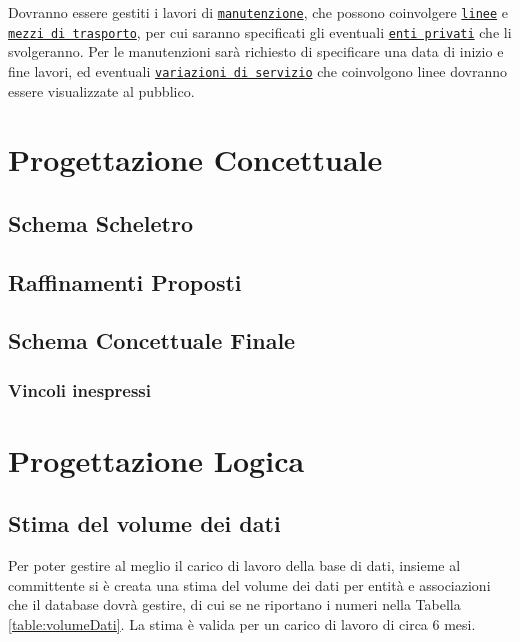 \documentclass[12pt,a4paper]{report}
\begin{document}
Dovranno essere gestiti i lavori di \underline{\texttt{manutenzione}}, che possono coinvolgere \underline{\texttt{linee}} e \underline{\texttt{mezzi di trasporto}}, per cui saranno specificati gli eventuali \underline{\texttt{enti privati}} che li svolgeranno. Per le manutenzioni sarà richiesto di specificare una data di inizio e fine lavori, ed eventuali \underline{\texttt{variazioni di servizio}} che coinvolgono linee dovranno essere visualizzate al pubblico.

\chapter{Progettazione Concettuale}
\section{Schema Scheletro}
\section{Raffinamenti Proposti}
\section{Schema Concettuale Finale}
\subsection{Vincoli inespressi}

\chapter{Progettazione Logica}
\section{Stima del volume dei dati}
Per poter gestire al meglio il carico di lavoro della base di dati, insieme al committente si è creata una stima del volume dei dati per entità e associazioni che il database dovrà gestire, di cui se ne riportano i numeri nella Tabella \ref{table:volumeDati}.
La stima è valida per un carico di lavoro di circa 6 mesi.
\end{document}
